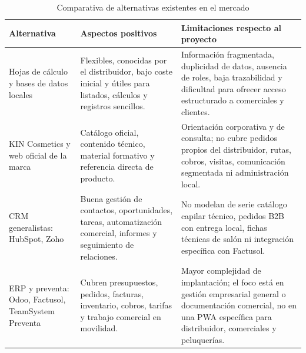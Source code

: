 {\small
\renewcommand{\arraystretch}{1.22}
\begin{table}[H]
\centering
\caption{Comparativa de alternativas existentes en el mercado}
\label{tab:comparativa-alternativas-mercado}
\begin{tabularx}{\textwidth}{|>{\RaggedRight\arraybackslash}p{}|>{\RaggedRight\arraybackslash}X|>{\RaggedRight\arraybackslash}X|}
\hline
\rowcolor{black!8}
\textbf{Alternativa} & \textbf{Aspectos positivos} & \textbf{Limitaciones respecto al proyecto} \\
\hline
Hojas de cálculo y bases de datos locales & Flexibles, conocidas por el distribuidor, bajo coste inicial y útiles para listados, cálculos y registros sencillos. & Información fragmentada, duplicidad de datos, ausencia de roles, baja trazabilidad y dificultad para ofrecer acceso estructurado a comerciales y clientes. \\
\hline
KIN Cosmetics y web oficial de la marca & Catálogo oficial, contenido técnico, material formativo y referencia directa de producto. & Orientación corporativa y de consulta; no cubre pedidos propios del distribuidor, rutas, cobros, visitas, comunicación segmentada ni administración local. \\
\hline
CRM generalistas: HubSpot, Zoho & Buena gestión de contactos, oportunidades, tareas, automatización comercial, informes y seguimiento de relaciones. & No modelan de serie catálogo capilar técnico, pedidos B2B con entrega local, fichas técnicas de salón ni integración específica con Factusol. \\
\hline
ERP y preventa: Odoo, Factusol, TeamSystem Preventa & Cubren presupuestos, pedidos, facturas, inventario, cobros, tarifas y trabajo comercial en movilidad. & Mayor complejidad de implantación; el foco está en gestión empresarial general o documentación comercial, no en una PWA específica para distribuidor, comerciales y peluquerías. \\
\hline
\end{tabularx}
\end{table}

}

